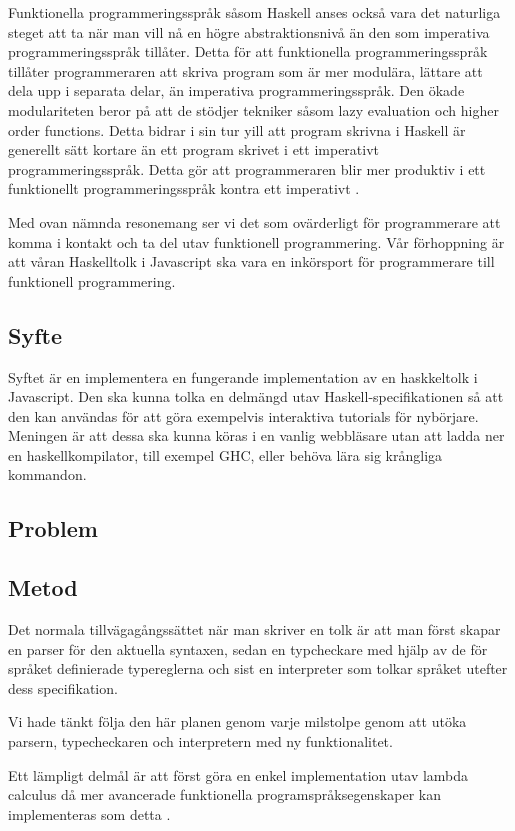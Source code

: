 Funktionella programmeringsspråk såsom Haskell anses också vara det naturliga steget att ta när man vill nå en högre abstraktionsnivå än den som imperativa programmeringsspråk tillåter.
Detta för att funktionella programmeringsspråk tillåter programmeraren att skriva program som är mer modulära, lättare att dela upp i separata delar, än imperativa programmeringsspråk. Den ökade modulariteten beror på att de stödjer tekniker såsom lazy evaluation och higher order functions.
Detta bidrar i sin tur yill att program skrivna i Haskell är generellt sätt kortare än ett program skrivet i ett imperativt programmeringsspråk. Detta gör att programmeraren blir mer produktiv i ett funktionellt programmeringsspråk kontra ett imperativt \citep{why}.

Med ovan nämnda resonemang ser vi det som ovärderligt för programmerare att komma i kontakt och ta del utav funktionell programmering. 
Vår förhoppning är att våran Haskelltolk i Javascript ska vara en inkörsport för programmerare till funktionell programmering.

\subsection{Syfte}
Syftet är en implementera en fungerande implementation av en haskkeltolk i Javascript. Den ska kunna tolka en delmängd utav Haskell-specifikationen så att den kan användas för att göra exempelvis interaktiva tutorials för nybörjare.
Meningen är att dessa ska kunna köras i en vanlig webbläsare utan att ladda ner en haskellkompilator, till exempel GHC, eller behöva lära sig krångliga kommandon.

\subsection{Problem} 

\subsection{Metod} 
Det normala tillvägagångssättet när man skriver en tolk är att man först
skapar en parser för den aktuella syntaxen, sedan en typcheckare med 
hjälp av de för språket definierade typereglerna och sist en interpreter
som tolkar språket utefter dess specifikation.

Vi hade tänkt följa den här planen genom varje milstolpe genom att utöka parsern, typecheckaren och interpretern med ny funktionalitet.

Ett lämpligt delmål är att först göra en enkel implementation utav lambda calculus då mer avancerade funktionella programspråksegenskaper kan implementeras som detta \citep{jones87}.

